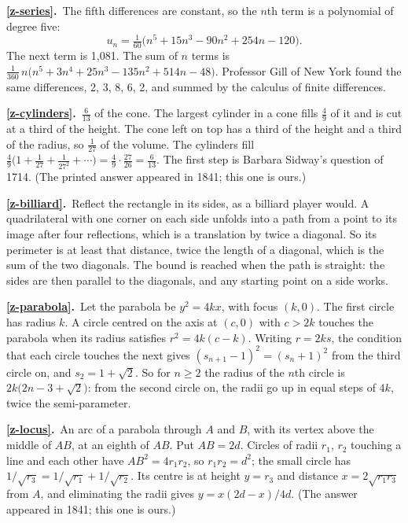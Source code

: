 \documentclass[11pt,a4paper]{article}
\newcommand{\ans}[2]{\par\smallskip\noindent\textbf{\ref{#1}.}\ #2}
\begin{document}
\ans{z-series}{The fifth differences are constant, so the $n$th term is a polynomial of
degree five:
\[ u_n = \tfrac1{60}\bigl(n^5 + 15n^3 - 90n^2 + 254n - 120\bigr). \]
The next term is 1,081. The sum of $n$ terms is
$\tfrac1{360}\,n\bigl(n^5 + 3n^4 + 25n^3 - 135n^2 + 514n - 48\bigr)$. Professor Gill of
New York found the same differences, 2, 3, 8, 6, 2, and summed by the calculus of finite
differences.}

\ans{z-cylinders}{$\tfrac6{13}$ of the cone. The largest cylinder in a cone fills
$\tfrac49$ of it and is cut at a third of the height. The cone left on top has a third of
the height and a third of the radius, so $\tfrac1{27}$ of the volume. The cylinders fill
$\tfrac49\bigl(1 + \tfrac1{27} + \tfrac1{27^2} + \cdots\bigr) = \tfrac49\cdot\tfrac{27}{26} =
\tfrac6{13}$. The first step is Barbara Sidway's question of 1714. (The printed answer
appeared in 1841; this one is ours.)}

\ans{z-billiard}{Reflect the rectangle in its sides, as a billiard player would. A
quadrilateral with one corner on each side unfolds into a path from a point to its image
after four reflections, which is a translation by twice a diagonal. So its perimeter is at
least that distance, twice the length of a diagonal, which is the sum of the two
diagonals. The bound is reached when the path is straight: the sides are then parallel to
the diagonals, and any starting point on a side works.}

\ans{z-parabola}{Let the parabola be $y^2 = 4kx$, with focus $(k, 0)$. The first circle has
radius $k$. A circle centred on the axis at $(c, 0)$ with $c > 2k$ touches the parabola
when its radius satisfies $r^2 = 4k(c - k)$. Writing $r = 2ks$, the condition that each
circle touches the next gives $(s_{n+1} - 1)^2 = (s_n + 1)^2$ from the third circle on, and
$s_2 = 1 + \sqrt2$. So for $n \ge 2$ the radius of the $n$th circle is
$2k\bigl(2n - 3 + \sqrt2\bigr)$: from the second circle on, the radii go up in equal steps
of $4k$, twice the semi-parameter.}

\ans{z-locus}{An arc of a parabola through $A$ and $B$, with its vertex above the middle of
$AB$, at an eighth of $AB$. Put $AB = 2d$. Circles of radii $r_1$, $r_2$ touching a line
and each other have $AB^2 = 4r_1r_2$, so $r_1r_2 = d^2$; the small circle has
$1/\sqrt{r_3} = 1/\sqrt{r_1} + 1/\sqrt{r_2}$. Its centre is at height $y = r_3$ and
distance $x = 2\sqrt{r_1r_3}$ from $A$, and eliminating the radii gives
$y = x(2d - x)/4d$. (The answer appeared in 1841; this one is ours.)}
\end{document}
